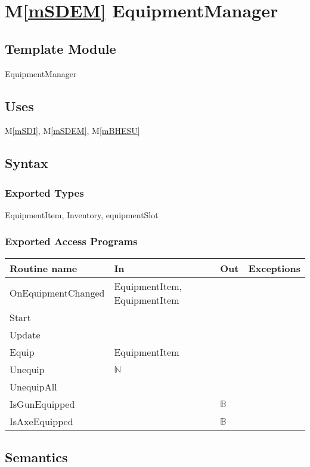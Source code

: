 \documentclass[12pt]{article}
\newcommand{\mref}[1]{M\ref{#1}}
\begin{document}
\section* {\mref{mSDEM} EquipmentManager}

\subsection*{Template Module}

EquipmentManager

\subsection* {Uses}

\mref{mSDI}, \mref{mSDEM}, \mref{mBHESU}

\subsection* {Syntax}

\subsubsection* {Exported Types}

EquipmentItem, Inventory, equipmentSlot

\subsubsection* {Exported Access Programs}

\begin{tabular}{| l | l | l | l |}
\hline
\textbf{Routine name} & \textbf{In} & \textbf{Out} & \textbf{Exceptions}\\
\hline
OnEquipmentChanged & EquipmentItem, EquipmentItem & ~  & ~\\
Start &~ & ~  & ~\\
Update &~ & ~  & ~\\
Equip & EquipmentItem & ~  & ~\\
Unequip & $\mathbb{N}$ & ~  & ~\\
UnequipAll &~ & ~  & ~ \\
{\color{magenta} IsGunEquipped} &~ & {\color{magenta} $\mathbb{B}$}  & ~ \\
{\color{magenta} IsAxeEquipped} &~ & {\color{magenta} $\mathbb{B}$}  & ~ \\
\hline
\end{tabular}

\subsection* {Semantics}
\end{document}
